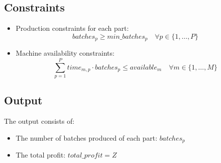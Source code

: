 \documentclass{article}
\begin{document}
\subsection*{Constraints}
\begin{itemize}
    \item Production constraints for each part:
    \[
    batches_{p} \geq min\_batches_{p} \quad \forall p \in \{1, \ldots, P\}
    \]
    \item Machine availability constraints:
    \[
    \sum_{p=1}^{P} time_{m,p} \cdot batches_{p} \leq available_{m} \quad \forall m \in \{1, \ldots, M\}
    \]
\end{itemize}

\subsection*{Output}
The output consists of:
\begin{itemize}
    \item The number of batches produced of each part: $batches_{p}$
    \item The total profit: $total\_profit = Z$
\end{itemize}
\end{document}
